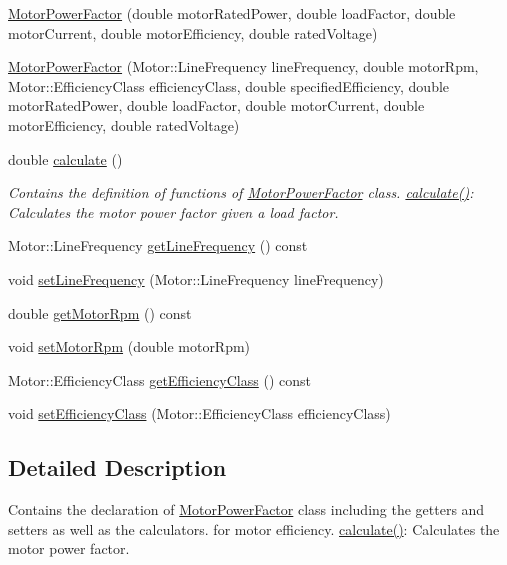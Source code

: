 \begin{DoxyCompactItemize}
\item 
\hyperlink{class_motor_power_factor_a1a2509240f0f759952debf47b7ef3a14}{Motor\+Power\+Factor} (double motor\+Rated\+Power, double load\+Factor, double motor\+Current, double motor\+Efficiency, double rated\+Voltage)
\item 
\hyperlink{class_motor_power_factor_ab48906ae429e7c6f05cebaed14fe2ca1}{Motor\+Power\+Factor} (Motor\+::\+Line\+Frequency line\+Frequency, double motor\+Rpm, Motor\+::\+Efficiency\+Class efficiency\+Class, double specified\+Efficiency, double motor\+Rated\+Power, double load\+Factor, double motor\+Current, double motor\+Efficiency, double rated\+Voltage)
\item 
double \hyperlink{class_motor_power_factor_ac9d5742db4a371bc4e15d5b29d335b6e}{calculate} ()
\begin{DoxyCompactList}\small\item\em Contains the definition of functions of \hyperlink{class_motor_power_factor}{Motor\+Power\+Factor} class. \hyperlink{class_motor_power_factor_ac9d5742db4a371bc4e15d5b29d335b6e}{calculate()}\+: Calculates the motor power factor given a load factor. \end{DoxyCompactList}\item 
Motor\+::\+Line\+Frequency \hyperlink{class_motor_power_factor_aa4cdc420b1f611bcb9f4a69c69c1fabf}{get\+Line\+Frequency} () const
\item 
void \hyperlink{class_motor_power_factor_a5186ccae4191cfc5b2b7c3bdbd166563}{set\+Line\+Frequency} (Motor\+::\+Line\+Frequency line\+Frequency)
\item 
double \hyperlink{class_motor_power_factor_acc7e144fc6c05446141cb0e07be03d70}{get\+Motor\+Rpm} () const
\item 
void \hyperlink{class_motor_power_factor_a4154bf52c6c9c9e5fb2f0985d7ae3531}{set\+Motor\+Rpm} (double motor\+Rpm)
\item 
Motor\+::\+Efficiency\+Class \hyperlink{class_motor_power_factor_a1ce98cb6ae9fbf09b05b4b6bd75e5c71}{get\+Efficiency\+Class} () const
\item 
void \hyperlink{class_motor_power_factor_add3125243d7f11131abc4e1d172ffdfc}{set\+Efficiency\+Class} (Motor\+::\+Efficiency\+Class efficiency\+Class)
\end{DoxyCompactItemize}


\subsection{Detailed Description}
Contains the declaration of \hyperlink{class_motor_power_factor}{Motor\+Power\+Factor} class including the getters and setters as well as the calculators. for motor efficiency. \hyperlink{class_motor_power_factor_ac9d5742db4a371bc4e15d5b29d335b6e}{calculate()}\+: Calculates the motor power factor. 

